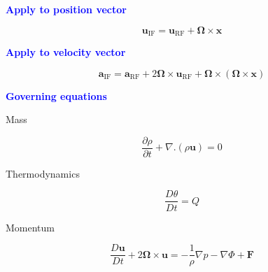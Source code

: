 \documentclass[a4]{seminar}
\newcommand{\B}[1]{\textcolor{blue}{#1}}
\begin{document}

\begin{slide}

\B{\bf Apply to position vector}

\vspace{3mm}

\begin{displaymath}
\mathbf{u}_{\mathrm{IF}}
=
\mathbf{u}_{\mathrm{RF}} + \boldsymbol{\Omega} \times \mathbf{x}
\end{displaymath}

\vspace{6mm}

\B{\bf Apply to velocity vector}

\vspace{3mm}

\begin{displaymath}
\mathbf{a}_{\mathrm{IF}}
=
\mathbf{a}_{\mathrm{RF}} + 2 \boldsymbol{\Omega} \times \mathbf{u}_{\mathrm{RF}}
+ \boldsymbol{\Omega} \times ( \boldsymbol{\Omega} \times \mathbf{x} )
\end{displaymath}

\vspace{3mm}


\end{slide}


\begin{slide}

\B{\bf Governing equations}

\vspace{3mm}

Mass

\begin{displaymath}
\frac{\partial \rho}{\partial t}  + \nabla . (\rho \mathbf{u})= 0
\end{displaymath}

\vspace{3mm}

Thermodynamics

\begin{displaymath}
\frac{D \theta}{Dt} = Q
\end{displaymath}

\vspace{3mm}

Momentum

\begin{displaymath}
\frac{D \mathbf{u}}{D t} +
2 \boldsymbol{\Omega} \times \mathbf{u}
=
- \frac{1}{\rho} \nabla p 
- \nabla \Phi
+ \mathbf{F}
\end{displaymath}


\end{slide}
\end{document}
